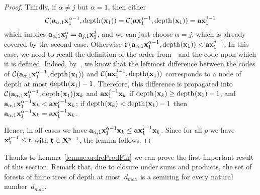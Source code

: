 \begin{proof}
			Thirdly, if $\alpha \ne j$ but $\alpha = 1$, then either
                        \[
                        \cut{\tree{a}_{\alpha,1}\tree{x}_1^{\alpha-1}}{\depth{\tree{x}_1}} = \cut{\tree{a} \tree{x}_1^{j-1}}{\depth{\tree{x}_1}} = \tree{a} \tree{x}_1^{j-1}
                        \]
                        which implies $\tree{a}_{\alpha,1}\tree{x}_1^{\alpha} = \tree{a}_{j,1}\tree{x}_1^{j}$, and we can just choose $\alpha=j$, which is already covered by the second case. 
			Otherwise $\cut{\tree{a}_{\alpha,1}\tree{x}_1^{\alpha-1}}{\depth{\tree{x}_1}} < \tree{a} \tree{x}_1^{j-1}$. 
			In this case, we need to recall the definition of the order from~\cite{article_arbre}~and the code upon which it is defined. 
			Indeed, by~\cite[Lemma 17]{article_arbre}, we know that the leftmost difference between the codes of $\cut{\tree{a}_{\alpha,1}\tree{x}_1^{\alpha-1}}{\depth{\tree{x}_1}}$ and $\cut{\tree{a} \tree{x}_1^{j-1}}{\depth{\tree{x}_1}}$ corresponds to a node of depth at most $\depth{\tree{x}_1} - 1$. 
			Therefore, this difference is propagated into $\cut{\tree{a}_{\alpha,1}\tree{x}_1^{\alpha-1}}{\depth{\tree{x}_1}} \tree{x}_k$ and $\tree{a} \tree{x}_1^{j-1} \tree{x}_k$ if $\depth{\tree{x}_k} \ge \depth{\tree{x}_1}-1$, and $\tree{a}_{\alpha,1} \tree{x}_1^{\alpha-1} \tree{x}_k < \tree{a} \tree{x}_1^{j-1} \tree{x}_k$; if $\depth{\tree{x}_k} < \depth{\tree{x}_1}-1$ then $\tree{a}_{\alpha,1} \tree{x}_1^{\alpha-1} \tree{x}_k = \tree{a} \tree{x}_1^{j-1} \tree{x}_k$.
			
			Hence, in all cases we have $\tree{a}_{\alpha,1} \tree{x}_1^{\alpha-1} \tree{x}_k \le \tree{a} \tree{x}_1^{j-1} \tree{x}_k$.
			Since for all $p$ we have $\tree{x}_1^{p-1} \le \tree{t}$ with $\tree{t} \in \forest{X}^{p-1}$, the lemma follows.
		\end{proof}
		
		Thanks to Lemma~\ref{lemme:ordreProdFin} we can prove the first important result of this section. Remark that, due to closure under sums and products, the set of forests of finite trees of depth at most~$d_{max}$ is a semiring for every natural number~$d_{max}$.
		
